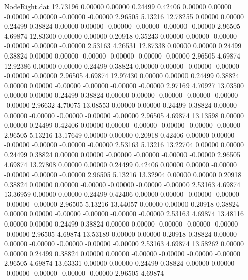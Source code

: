 \begin{filecontents}{NodeRight.dat}
  12.73196    0.00000    0.00000     0.24499    0.42406    0.00000    0.00000   -0.00000   -0.00000   -0.00000   -0.00000    2.96505    5.13216
  12.78255    0.00000    0.00000     0.24499    0.38824    0.00000    0.00000   -0.00000   -0.00000   -0.00000   -0.00000    2.96505    4.69874
  12.83300    0.00000    0.00000     0.20918    0.35243    0.00000    0.00000   -0.00000   -0.00000   -0.00000   -0.00000    2.53163    4.26531
  12.87338    0.00000    0.00000     0.24499    0.38824    0.00000    0.00000   -0.00000   -0.00000   -0.00000   -0.00000    2.96505    4.69874
  12.92386    0.00000    0.00000     0.24499    0.38824    0.00000    0.00000   -0.00000   -0.00000   -0.00000   -0.00000    2.96505    4.69874
  12.97430    0.00000    0.00000     0.24499    0.38824    0.00000    0.00000   -0.00000   -0.00000   -0.00000   -0.00000    2.97169    4.70927
  13.03500    0.00000    0.00000     0.24499    0.38824    0.00000    0.00000   -0.00000   -0.00000   -0.00000   -0.00000    2.96632    4.70075
  13.08553    0.00000    0.00000     0.24499    0.38824    0.00000    0.00000   -0.00000   -0.00000   -0.00000   -0.00000    2.96505    4.69874
  13.13598    0.00000    0.00000     0.24499    0.42406    0.00000    0.00000   -0.00000   -0.00000   -0.00000   -0.00000    2.96505    5.13216
  13.17649    0.00000    0.00000     0.20918    0.42406    0.00000    0.00000   -0.00000   -0.00000   -0.00000   -0.00000    2.53163    5.13216
  13.22704    0.00000    0.00000     0.24499    0.38824    0.00000    0.00000   -0.00000   -0.00000   -0.00000   -0.00000    2.96505    4.69874
  13.27808    0.00000    0.00000     0.24499    0.42406    0.00000    0.00000   -0.00000   -0.00000   -0.00000   -0.00000    2.96505    5.13216
  13.32904    0.00000    0.00000     0.20918    0.38824    0.00000    0.00000   -0.00000   -0.00000   -0.00000   -0.00000    2.53163    4.69874
  13.36959    0.00000    0.00000     0.24499    0.42406    0.00000    0.00000   -0.00000   -0.00000   -0.00000   -0.00000    2.96505    5.13216
  13.44057    0.00000    0.00000     0.20918    0.38824    0.00000    0.00000   -0.00000   -0.00000   -0.00000   -0.00000    2.53163    4.69874
  13.48116    0.00000    0.00000     0.24499    0.38824    0.00000    0.00000   -0.00000   -0.00000   -0.00000   -0.00000    2.96505    4.69874
  13.53189    0.00000    0.00000     0.20918    0.38824    0.00000    0.00000   -0.00000   -0.00000   -0.00000   -0.00000    2.53163    4.69874
  13.58262    0.00000    0.00000     0.24499    0.38824    0.00000    0.00000   -0.00000   -0.00000   -0.00000   -0.00000    2.96505    4.69874
  13.63331    0.00000    0.00000     0.24499    0.38824    0.00000    0.00000   -0.00000   -0.00000   -0.00000   -0.00000    2.96505    4.69874

\end{filecontents}
